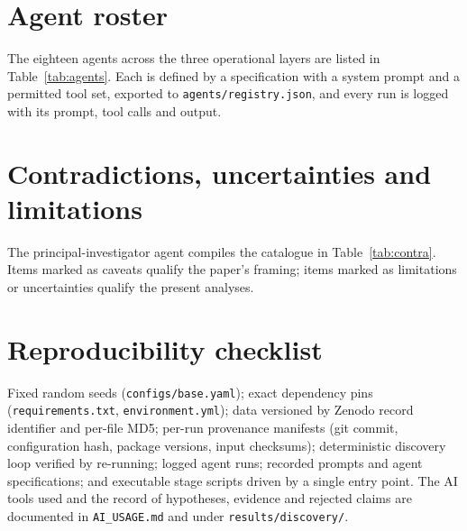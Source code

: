 \documentclass[11pt]{article}
\begin{document}
\appendix
\section{Agent roster}\label{app:agents}
The eighteen agents across the three operational layers are listed in Table~\ref{tab:agents}. Each
is defined by a specification with a system prompt and a permitted tool set, exported to
\texttt{agents/registry.json}, and every run is logged with its prompt, tool calls and output.

\begin{table}[h]
\centering
\caption{The agent roster (Layers 3--5).}
\label{tab:agents}
\footnotesize

\end{table}

\section{Contradictions, uncertainties and limitations}
The principal-investigator agent compiles the catalogue in Table~\ref{tab:contra}. Items marked as
caveats qualify the paper's framing; items marked as limitations or uncertainties qualify the
present analyses.

\begin{table}[h]
\centering
\caption{The catalogue produced by the discovery loop.}
\label{tab:contra}
\footnotesize

\end{table}

\section{Reproducibility checklist}
Fixed random seeds (\texttt{configs/base.yaml}); exact dependency pins (\texttt{requirements.txt},
\texttt{environment.yml}); data versioned by Zenodo record identifier and per-file MD5; per-run
provenance manifests (git commit, configuration hash, package versions, input checksums);
deterministic discovery loop verified by re-running; logged agent runs; recorded prompts and agent
specifications; and executable stage scripts driven by a single entry point. The AI tools used and
the record of hypotheses, evidence and rejected claims are documented in \texttt{AI\_USAGE.md} and
under \texttt{results/discovery/}.


\small


\end{document}
